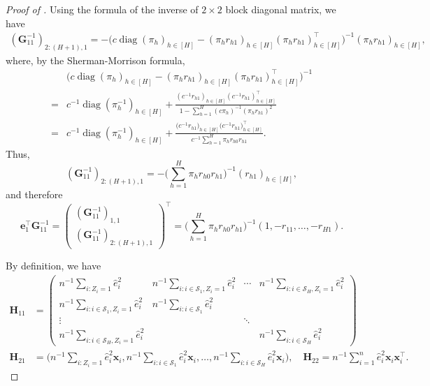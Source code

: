 \documentclass[12pt]{article}
\newcommand{\diag}{\operatorname{diag}}
\newcommand{\ms}{\mathcal{S}}
\newcommand{\bs}{\boldsymbol}
\begin{document}
\begin{proof}[Proof of ]
Using the formula of the inverse of $2\times 2$ block diagonal matrix, we have
\begin{align*}
    (\bs{G}_{11}^{-1})_{2:(H+1),1} = -\Big(c \diag(\pi_h)_{h\in [H]}-(\pi_{h}r_{h1})_{h\in [H]}(\pi_{h}r_{h1})_{h\in [H]}^\top\Big)^{-1} (\pi_{h}r_{h1})_{h\in [H]}, 
\end{align*}
where, by the Sherman-Morrison formula,
\begin{align*}
    &\Big(c \diag(\pi_h)_{h\in [H]}-(\pi_{h}r_{h1})_{h\in [H]}(\pi_{h}r_{h1})_{h\in [H]}^\top\Big)^{-1}\\
    =& c^{-1} \diag(\pi_h^{-1})_{h\in [H]} + \frac{(c^{-1}r_{h1})_{h\in [H]}(c^{-1}r_{h1})_{h\in [H]}^\top}{1-\sum_{h=1}^H (c\pi_h)^{-1}(\pi_{h}r_{h1})^2}\\
    =& c^{-1} \diag(\pi_h^{-1})_{h\in [H]} + \frac{\big(c^{-1}r_{h1}\big)_{h\in [H]}\big(c^{-1}r_{h1}\big)_{h\in [H]}^\top}{c^{-1}\sum_{h=1}^H \pi_{h} r_{h0} r_{h1}}.
\end{align*}
Thus, $$(\bs{G}_{11}^{-1})_{2:(H+1),1} = -\Big(\sum_{h=1}^H \pi_{h} r_{h0} r_{h1}\Big)^{-1}(r_{h1})_{h\in [H]}, $$
and therefore $$\bs{e}_1^\top  \bs{G}_{11}^{-1} = \begin{pmatrix}
        (\bs{G}_{11}^{-1})_{1,1}\\
        (\bs{G}_{11}^{-1})_{2:(H+1),1}
    \end{pmatrix}^\top = \Big(\sum_{h=1}^H \pi_{h} r_{h0} r_{h1}\Big)^{-1}(1,-r_{11},\ldots, -r_{H1}).$$

By definition, we have
\begin{align*}
    \bs{H}_{11} &= \begin{pmatrix}
        n^{-1}\sum_{i:Z_i=1} \hat{e}_i^2& n^{-1}\sum_{i:i\in\ms_1,Z_i=1}\hat{e}_i^2 & \cdots & 
 n^{-1} \sum_{i:i\in\ms_H,Z_i=1}\hat{e}_i^2\\
        n^{-1} \sum_{i:i\in\ms_1,Z_i=1}\hat{e}_i^2& n^{-1} \sum_{i:i\in\ms_1}\hat{e}_i^2 & &\\
        \vdots & & \ddots & \\
        n^{-1} \sum_{i:i\in\ms_H,Z_i=1}\hat{e}_i^2 &&& n^{-1} \sum_{i:i\in\ms_H}\hat{e}_i^2
    \end{pmatrix} \\
    \bs{H}_{21} &= \Big(n^{-1} \sum_{i:Z_i=1} \hat{e}_i^2 \bs{x}_i,n^{-1} \sum_{i:i\in\ms_{1}} \hat{e}_i^2 \bs{x}_i, \ldots, n^{-1} \sum_{i:i\in\ms_{H}} \hat{e}_i^2 \bs{x}_i \Big), \quad \bs{H}_{22} = n^{-1} \sum_{i=1}^n \hat{e}_i^2 \bs{x}_i\bs{x}_i^\top.
\end{align*}


\end{proof}
\end{document}
